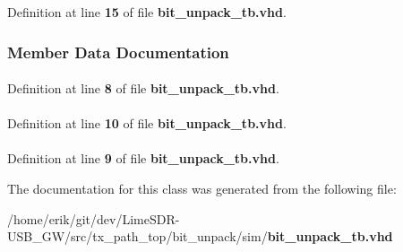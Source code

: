 Definition at line {\bf 15} of file {\bf bit\+\_\+unpack\+\_\+tb.\+vhd}.



\subsubsection{Member Data Documentation}
\paragraph[{ieee}]{\hspace{0.3cm}{\ttfamily [Library]}}\label{classbit__unpack__tb_a0a6af6eef40212dbaf130d57ce711256}


Definition at line {\bf 8} of file {\bf bit\+\_\+unpack\+\_\+tb.\+vhd}.

\paragraph[{numeric\+\_\+std}]{\hspace{0.3cm}{\ttfamily [Package]}}\label{classbit__unpack__tb_a2edc34402b573437d5f25fa90ba4013e}


Definition at line {\bf 10} of file {\bf bit\+\_\+unpack\+\_\+tb.\+vhd}.

\paragraph[{std\+\_\+logic\+\_\+1164}]{\hspace{0.3cm}{\ttfamily [Package]}}\label{classbit__unpack__tb_acd03516902501cd1c7296a98e22c6fcb}


Definition at line {\bf 9} of file {\bf bit\+\_\+unpack\+\_\+tb.\+vhd}.



The documentation for this class was generated from the following file\+:\begin{DoxyCompactItemize}
\item 
/home/erik/git/dev/\+Lime\+S\+D\+R-\/\+U\+S\+B\+\_\+\+G\+W/src/tx\+\_\+path\+\_\+top/bit\+\_\+unpack/sim/{\bf bit\+\_\+unpack\+\_\+tb.\+vhd}\end{DoxyCompactItemize}

